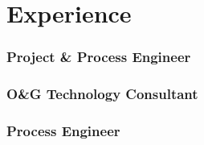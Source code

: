 %
%
\section{Experience}
  \subsubsection{Project \& Process Engineer}
  \position%
    {\EmpA}%
    {\EmpAdate}%
    \Location
%
%
  {\vspace{-1em}}
%
%
  \subsubsection{O\&G Technology Consultant}
  \position%
    {\EmpB}%
    {\EmpBdate}%
    \Location
%
%
  {\vspace{-1em}}
%
%
  \subsubsection{Process Engineer}
  \position%
    {\EmpC}%
    {\EmpCdate}%
    \Location
%
%
%